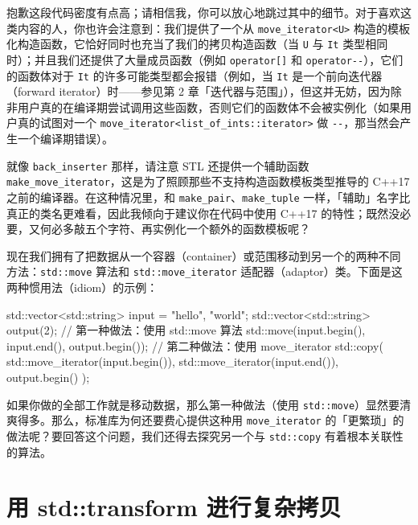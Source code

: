 抱歉这段代码密度有点高；请相信我，你可以放心地跳过其中的细节。对于喜欢这类内容的人，你也许会注意到：我们提供了一个从 \texttt{move\_\allowbreak{}iterator<\allowbreak{}U>\allowbreak{}} 构造的模板化构造函数，它恰好同时也充当了我们的拷贝构造函数（当 \texttt{U} 与 \texttt{It} 类型相同时）；并且我们还提供了大量成员函数（例如 \texttt{operator[]} 和 \texttt{operator-\/\allowbreak{}-}），它们的函数体对于 \texttt{It} 的许多可能类型都会报错（例如，当 \texttt{It} 是一个前向迭代器（forward iterator）时——参见第 2 章「迭代器与范围」），但这并无妨，因为除非用户真的在编译期尝试调用这些函数，否则它们的函数体不会被实例化（如果用户真的试图对一个 \texttt{move\_\allowbreak{}iterator<\allowbreak{}list\_\allowbreak{}of\_\allowbreak{}ints::\allowbreak{}iterator>\allowbreak{}} 做 \texttt{-\/\allowbreak{}-}，那当然会产生一个编译期错误）。

就像 \texttt{back\_\allowbreak{}inserter} 那样，请注意 STL 还提供一个辅助函数 \texttt{make\_\allowbreak{}move\_\allowbreak{}iterator}，这是为了照顾那些不支持构造函数模板类型推导的 C++17 之前的编译器。在这种情况里，和 \texttt{make\_\allowbreak{}pair}、\texttt{make\_\allowbreak{}tuple} 一样，「辅助」名字比真正的类名更难看，因此我倾向于建议你在代码中使用 C++17 的特性；既然没必要，又何必多敲五个字符、再实例化一个额外的函数模板呢？

现在我们拥有了把数据从一个容器（container）或范围移动到另一个的两种不同方法：\texttt{std::\allowbreak{}move} 算法和 \texttt{std::\allowbreak{}move\_\allowbreak{}iterator} 适配器（adaptor）类。下面是这两种惯用法（idiom）的示例：

\begin{codebox}[cpp]
    std::vector<std::string> input = {"hello", "world"};
    std::vector<std::string> output(2);
    // 第一种做法：使用 std::move 算法
    std::move(input.begin(), input.end(), output.begin());
    // 第二种做法：使用 move_iterator
    std::copy(
      std::move_iterator(input.begin()),
      std::move_iterator(input.end()),
      output.begin()
    );
\end{codebox}

如果你做的全部工作就是移动数据，那么第一种做法（使用 \texttt{std::\allowbreak{}move}）显然要清爽得多。那么，标准库为何还要费心提供这种用 \texttt{move\_\allowbreak{}iterator} 的「更繁琐」的做法呢？要回答这个问题，我们还得去探究另一个与 \texttt{std::\allowbreak{}copy} 有着根本关联性的算法。

\section{用 std::transform 进行复杂拷贝}

